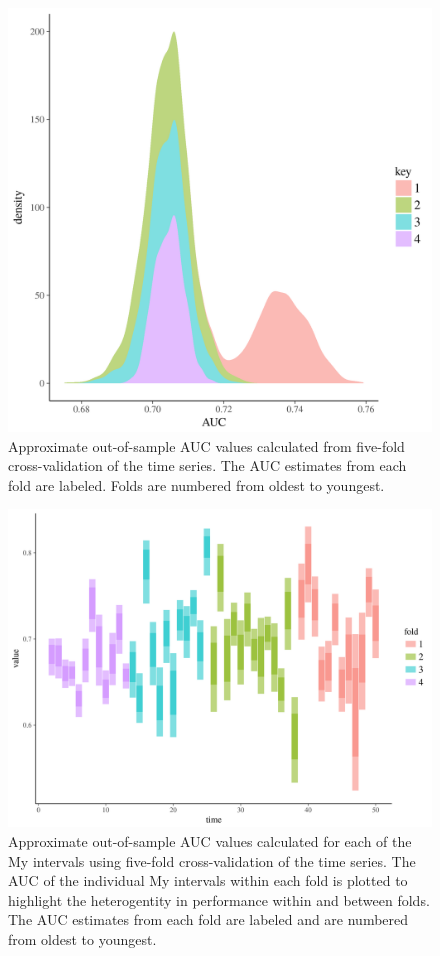 \documentclass[12pt,letterpaper]{article}
\begin{document}
\begin{figure}[ht]
  \centering
  \includegraphics[width=\textwidth,height=0.5\textheight,keepaspectratio=true]{figure/fold_auc}
  \caption{Approximate out-of-sample AUC values calculated from five-fold cross-validation of the time series. The AUC estimates from each fold are labeled. Folds are numbered from oldest to youngest.}
  \label{fig:fold_auc}
\end{figure}

\begin{figure}[ht]
  \centering
  \includegraphics[width=\textwidth,height=0.5\textheight,keepaspectratio=true]{figure/fold_auc_time}
  \caption{Approximate out-of-sample AUC values calculated for each of the My intervals using five-fold cross-validation of the time series. The AUC of the individual My intervals within each fold is plotted to highlight the heterogentity in performance within and between folds. The AUC estimates from each fold are labeled and are numbered from oldest to youngest.}
  \label{fig:fold_auc_time}
\end{figure}
\end{document}
